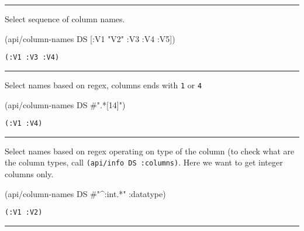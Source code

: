 \documentclass[]{article}
\newenvironment{Shaded}{\begin{snugshade}}{\end{snugshade}}
\newcommand{\StringTok}[1]{\textcolor[rgb]{0.31,0.60,0.02}{#1}}
\newcommand{\SpecialStringTok}[1]{\textcolor[rgb]{0.31,0.60,0.02}{#1}}
\newcommand{\AttributeTok}[1]{\textcolor[rgb]{0.77,0.63,0.00}{#1}}
\newcommand{\NormalTok}[1]{#1}
\begin{document}
\begin{center}\rule{0.5\linewidth}{0.5pt}\end{center}

Select sequence of column names.

\begin{Shaded}
\begin{Highlighting}[]
\NormalTok{(api/column-names DS [}\AttributeTok{:V1} \StringTok{"V2"} \AttributeTok{:V3} \AttributeTok{:V4} \AttributeTok{:V5}\NormalTok{])}
\end{Highlighting}
\end{Shaded}

\begin{verbatim}
(:V1 :V3 :V4)
\end{verbatim}

\begin{center}\rule{0.5\linewidth}{0.5pt}\end{center}

Select names based on regex, columns ends with \texttt{1} or \texttt{4}

\begin{Shaded}
\begin{Highlighting}[]
\NormalTok{(api/column-names DS }\SpecialStringTok{#".*[14]"}\NormalTok{)}
\end{Highlighting}
\end{Shaded}

\begin{verbatim}
(:V1 :V4)
\end{verbatim}

\begin{center}\rule{0.5\linewidth}{0.5pt}\end{center}

Select names based on regex operating on type of the column (to check
what are the column types, call \texttt{(api/info\ DS\ :columns)}. Here
we want to get integer columns only.

\begin{Shaded}
\begin{Highlighting}[]
\NormalTok{(api/column-names DS }\SpecialStringTok{#"^:int.*"} \AttributeTok{:datatype}\NormalTok{)}
\end{Highlighting}
\end{Shaded}

\begin{verbatim}
(:V1 :V2)
\end{verbatim}

\begin{center}\rule{0.5\linewidth}{0.5pt}\end{center}
\end{document}
